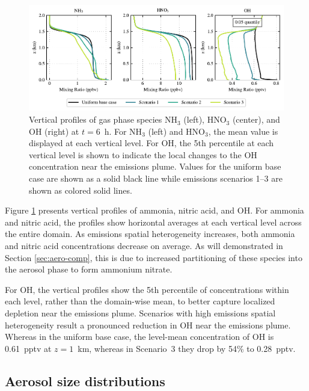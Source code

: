 \documentclass[journal abbreviation, manuscript]{copernicus}
\begin{document}
\begin{figure}[!h]
	\centering
	\includegraphics[]{figures/aerosol-gas-vertical-profiles-time36.pdf}
	\caption{Vertical profiles of gas phase species NH$_3$ (left),
          HNO$_3$ (center), and OH (right) at $t=6$~h. For NH$_3$
          (left) and HNO$_3$, the mean value is displayed at each
          vertical level. For OH, the 5th percentile at each vertical
          level is shown to indicate the local changes to the OH
          concentration near the emissions plume. Values for the
          uniform base case are shown as a solid black line while
          emissions scenarios 1--3 are shown as colored solid lines.}
	\label{fig:gas-profiles}
\end{figure} 

Figure \ref{fig:gas-profiles} presents vertical profiles of ammonia,
nitric acid, and OH. For ammonia and nitric acid, the profiles show
horizontal averages at each vertical level across the entire domain.
As emissions spatial heterogeneity increases, both ammonia and nitric
acid concentrations decrease on average. As will demonstrated in
Section \ref{sec:aero-comp}, this is due to increased partitioning of
these species into the aerosol phase to form ammonium nitrate.

For OH, the vertical profiles show the 5th percentile of
concentrations within each level, rather than the domain-wise mean, to
better capture localized depletion near the emissions plume. Scenarios
with high emissions spatial heterogeneity result a pronounced
reduction in OH near the emissions plume. Whereas in the uniform base
case, the level-mean concentration of OH is 0.61~pptv at $z=1$~km,
whereas in Scenario~3 they drop by 54\%
to 0.28~pptv.

\subsection{Aerosol size distributions}\label{sec:size-dist}
\end{document}

